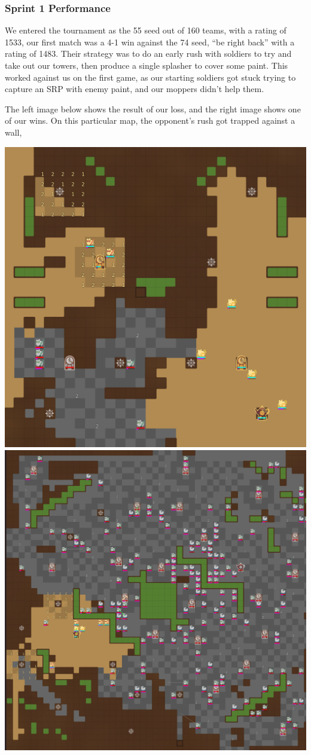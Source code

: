 \documentclass{article}
\begin{document}
  \subsubsection{Sprint 1 Performance}

  We entered the tournament as the 55 seed out of 160 teams, with a rating of 1533, our first match was a 4-1 win against the 74 seed, ``be right back'' with a rating of 1483. Their strategy was to do an early rush with soldiers to try and take out our towers, then produce a single splasher to cover some paint. This worked against us on the first game, as our starting soldiers got stuck trying to capture an SRP with enemy paint, and our moppers didn't help them.

  \medskip

  The left image below shows the result of our loss, and the right image shows one of our wins. On this particular map, the opponent's rush got trapped against a wall, 
  \begin{center}
    \includegraphics[scale=0.1]{images/sprint1_loss.png}
    \includegraphics[scale=0.1]{images/sprint1_win.png}
  \end{center}
\end{document}
